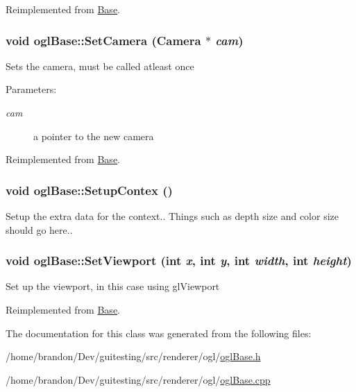 Reimplemented from \hyperlink{class_base_78a8e2e08b7c6ecbe164c49630aabd4e}{Base}.\hypertarget{classogl_base_670c661d28fb47da29f4a7ba2ea39f87}{
\subsubsection[{SetCamera}]{\setlength{\rightskip}{0pt plus 5cm}void oglBase::SetCamera ({\bf Camera} $\ast$ {\em cam})}}
\label{classogl_base_670c661d28fb47da29f4a7ba2ea39f87}


Sets the camera, must be called atleast once \begin{Desc}
\item[Parameters:]
\begin{description}
\item[{\em cam}]a pointer to the new camera \end{description}
\end{Desc}


Reimplemented from \hyperlink{class_base_3502b98c0b0a3a8c4e4dc34fad149087}{Base}.\hypertarget{classogl_base_f3a0c08f71bda7be4c20aef2247e5b52}{
\subsubsection[{SetupContex}]{\setlength{\rightskip}{0pt plus 5cm}void oglBase::SetupContex ()}}
\label{classogl_base_f3a0c08f71bda7be4c20aef2247e5b52}


Setup the extra data for the context.. Things such as depth size and color size should go here.. \hypertarget{classogl_base_ea045b4b3e3db04be98919a4cbec22bc}{
\subsubsection[{SetViewport}]{\setlength{\rightskip}{0pt plus 5cm}void oglBase::SetViewport (int {\em x}, \/  int {\em y}, \/  int {\em width}, \/  int {\em height})}}
\label{classogl_base_ea045b4b3e3db04be98919a4cbec22bc}


Set up the viewport, in this case using glViewport 

Reimplemented from \hyperlink{class_base_1716db3ad36a8cbb807c9096899b7264}{Base}.

The documentation for this class was generated from the following files:\begin{CompactItemize}
\item 
/home/brandon/Dev/guitesting/src/renderer/ogl/\hyperlink{ogl_base_8h}{oglBase.h}\item 
/home/brandon/Dev/guitesting/src/renderer/ogl/\hyperlink{ogl_base_8cpp}{oglBase.cpp}\end{CompactItemize}
